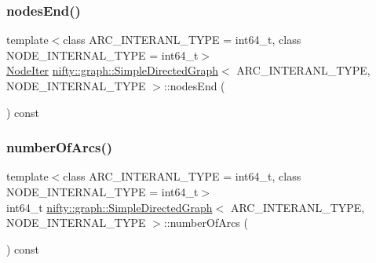 \mbox{\label{classnifty_1_1graph_1_1SimpleDirectedGraph_a87f8944d79ef5c0098f3f14e0e47046f}} 
\subsubsection{\texorpdfstring{nodes\+End()}{nodesEnd()}}
{\footnotesize\ttfamily template$<$class A\+R\+C\+\_\+\+I\+N\+T\+E\+R\+A\+N\+L\+\_\+\+T\+Y\+PE  = int64\+\_\+t, class N\+O\+D\+E\+\_\+\+I\+N\+T\+E\+R\+N\+A\+L\+\_\+\+T\+Y\+PE  = int64\+\_\+t$>$ \\
\hyperlink{classnifty_1_1graph_1_1SimpleDirectedGraph_a50b05474da6846da32398e01be9e3d30}{Node\+Iter} \hyperlink{classnifty_1_1graph_1_1SimpleDirectedGraph}{nifty\+::graph\+::\+Simple\+Directed\+Graph}$<$ A\+R\+C\+\_\+\+I\+N\+T\+E\+R\+A\+N\+L\+\_\+\+T\+Y\+PE, N\+O\+D\+E\+\_\+\+I\+N\+T\+E\+R\+N\+A\+L\+\_\+\+T\+Y\+PE $>$\+::nodes\+End (\begin{DoxyParamCaption}{ }\end{DoxyParamCaption}) const\hspace{0.3cm}{\ttfamily [inline]}}

\mbox{\label{classnifty_1_1graph_1_1SimpleDirectedGraph_a94e69d068fb6c150939838639120482c}} 
\subsubsection{\texorpdfstring{number\+Of\+Arcs()}{numberOfArcs()}}
{\footnotesize\ttfamily template$<$class A\+R\+C\+\_\+\+I\+N\+T\+E\+R\+A\+N\+L\+\_\+\+T\+Y\+PE  = int64\+\_\+t, class N\+O\+D\+E\+\_\+\+I\+N\+T\+E\+R\+N\+A\+L\+\_\+\+T\+Y\+PE  = int64\+\_\+t$>$ \\
int64\+\_\+t \hyperlink{classnifty_1_1graph_1_1SimpleDirectedGraph}{nifty\+::graph\+::\+Simple\+Directed\+Graph}$<$ A\+R\+C\+\_\+\+I\+N\+T\+E\+R\+A\+N\+L\+\_\+\+T\+Y\+PE, N\+O\+D\+E\+\_\+\+I\+N\+T\+E\+R\+N\+A\+L\+\_\+\+T\+Y\+PE $>$\+::number\+Of\+Arcs (\begin{DoxyParamCaption}{ }\end{DoxyParamCaption}) const\hspace{0.3cm}{\ttfamily [inline]}}

